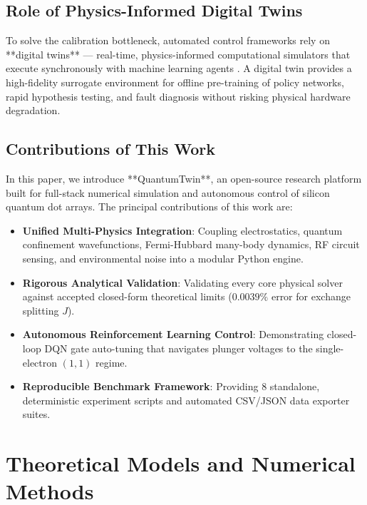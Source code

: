 \documentclass[journal,twocolumn,10pt]{IEEEtran}
\begin{document}
\subsection{Role of Physics-Informed Digital Twins}
To solve the calibration bottleneck, automated control frameworks rely on **digital twins** — real-time, physics-informed computational simulators that execute synchronously with machine learning agents \cite{Darulova2020}. A digital twin provides a high-fidelity surrogate environment for offline pre-training of policy networks, rapid hypothesis testing, and fault diagnosis without risking physical hardware degradation.

\subsection{Contributions of This Work}
In this paper, we introduce **QuantumTwin**, an open-source research platform built for full-stack numerical simulation and autonomous control of silicon quantum dot arrays. The principal contributions of this work are:
\begin{itemize}
    \item \textbf{Unified Multi-Physics Integration}: Coupling electrostatics, quantum confinement wavefunctions, Fermi-Hubbard many-body dynamics, RF circuit sensing, and environmental noise into a modular Python engine.
    \item \textbf{Rigorous Analytical Validation}: Validating every core physical solver against accepted closed-form theoretical limits ($0.0039\%$ error for exchange splitting $J$).
    \item \textbf{Autonomous Reinforcement Learning Control}: Demonstrating closed-loop DQN gate auto-tuning that navigates plunger voltages to the single-electron $(1,1)$ regime.
    \item \textbf{Reproducible Benchmark Framework}: Providing 8 standalone, deterministic experiment scripts and automated CSV/JSON data exporter suites.
\end{itemize}

\section{Theoretical Models and Numerical Methods}
\end{document}
